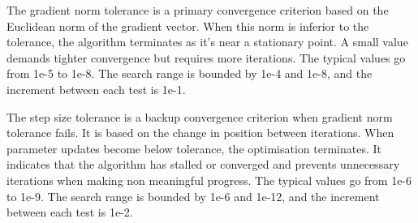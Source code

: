 The gradient norm tolerance is a primary convergence criterion based on the Euclidean norm of the gradient vector. When this norm is inferior to the tolerance, the algorithm terminates as it’s near a stationary point. A small value demands tighter convergence but requires more iterations. \cite[Section 2.1]{nocedalwright2006}
The typical values go from 1e-5 to 1e-8. The search range is bounded by 1e-4 and 1e-8, and the increment between each test is 1e-1.
\begin{table}[H]
    \centering
    \caption{Exploration of gradient norm tolerance}
    \label{tab:truss_exp_grad}
\end{table}

The step size tolerance is a backup convergence criterion when gradient norm tolerance fails. It is based on the change in position between iterations. When parameter updates become below tolerance, the optimisation terminates. It indicates that the algorithm has stalled or converged and prevents unnecessary iterations when making non meaningful progress. \cite[Chapter 2]{nocedalwright2006}
The typical values go from 1e-6 to 1e-9. The search range is bounded by 1e-6 and 1e-12, and the increment between each test is 1e-2.
\begin{table}[H]
    \centering
    \caption{Exploration of step size tolerance}
    \label{tab:truss_exp_step}
\end{table}


